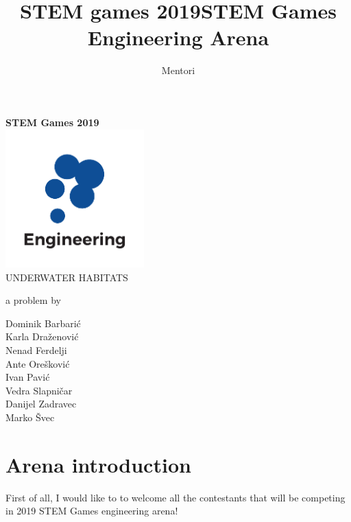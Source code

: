 \documentclass{article}
\title{STEM games 2019}
\author{Mentori}
\title{STEM Games Engineering Arena}
\date{}
\begin{document}
	
	\thispagestyle{empty}
	\newpage
	\thispagestyle{empty}
	\vspace*{0cm}
	\begin{center}
		
		\textbf{\Huge{STEM Games 2019}}\\
		\vspace*{2.4cm}
		\includegraphics[width=0.4\textwidth]{logos/engineering} \\
		\vspace*{2.4cm}
		\huge{UNDERWATER HABITATS}
		
		\medskip
		
		\normalsize{a problem by}
		
		\medskip
		
		Dominik Barbarić \\
		Karla Draženović \\
		Nenad Ferdelji \\
		Ante Orešković \\
		Ivan Pavić \\
		Vedra Slapničar \\
		Danijel Zadravec \\
		Marko Švec 
		
		\vspace{6cm}
		
		
		\normalsize{}
	\end{center}

	\newpage
	\section{Arena introduction}
	
	First of all, I would like to to welcome all the contestants that will be 
	competing in 
	2019 STEM Games engineering arena!
	
\end{document}
